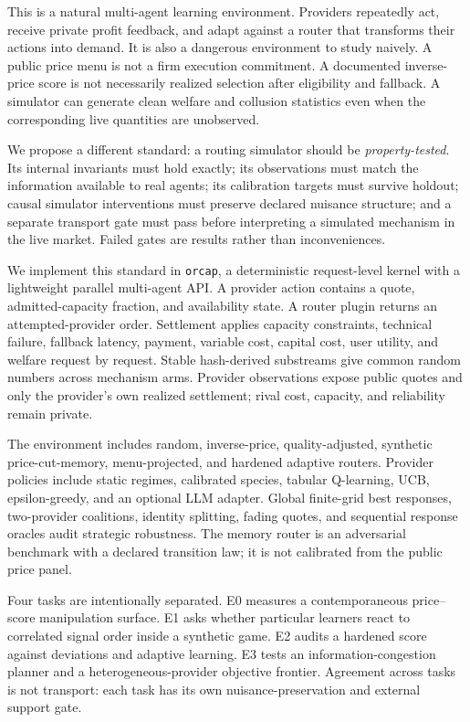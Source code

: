 \documentclass[10pt]{article}
\newcommand{\1}{\mathbf 1}
\begin{document}
This is a natural multi-agent learning environment.  Providers repeatedly act,
receive private profit feedback, and adapt against a router that transforms
their actions into demand.  It is also a dangerous environment to study
naively.  A public price menu is not a firm execution commitment.  A documented
inverse-price score is not necessarily realized selection after eligibility and
fallback.  A simulator can generate clean welfare and collusion statistics even
when the corresponding live quantities are unobserved.

We propose a different standard: a routing simulator should be
\emph{property-tested}.  Its internal invariants must hold exactly; its
observations must match the information available to real agents; its
calibration targets must survive holdout; causal simulator interventions must
preserve declared nuisance structure; and a separate transport gate must pass
before interpreting a simulated mechanism in the live market.  Failed gates are
results rather than inconveniences.

We implement this standard in \texttt{orcap}, a deterministic request-level
kernel with a lightweight parallel multi-agent API.  A provider action contains
a quote, admitted-capacity fraction, and availability state.  A router plugin
returns an attempted-provider order.  Settlement applies capacity constraints,
technical failure, fallback latency, payment, variable cost, capital cost, user
utility, and welfare request by request.  Stable hash-derived substreams give
common random numbers across mechanism arms.  Provider observations expose
public quotes and only the provider's own realized settlement; rival cost,
capacity, and reliability remain private.

The environment includes random, inverse-price, quality-adjusted, synthetic
price-cut-memory, menu-projected, and hardened adaptive routers.  Provider policies include
static regimes, calibrated species, tabular Q-learning, UCB, epsilon-greedy, and
an optional LLM adapter.  Global finite-grid best responses, two-provider
coalitions, identity splitting, fading quotes, and sequential response oracles
audit strategic robustness.  The memory router is an adversarial benchmark with
a declared transition law; it is not calibrated from the public price panel.

Four tasks are intentionally separated.  E0 measures a contemporaneous
price--score manipulation surface.  E1 asks whether particular learners react
to correlated signal order inside a synthetic game.  E2 audits a hardened score
against deviations and adaptive learning.  E3 tests an information-congestion
planner and a heterogeneous-provider objective frontier.  Agreement across
tasks is not transport: each task has its own nuisance-preservation and external
support gate.
\end{document}
